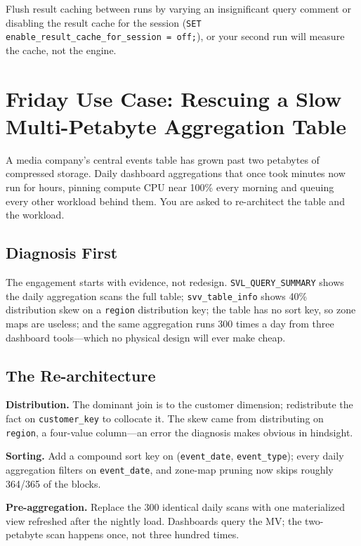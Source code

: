 \begin{tipbox}
Flush result caching between runs by varying an insignificant query comment or disabling the result cache for the session (\texttt{SET enable\_result\_cache\_for\_session = off;}), or your second run will measure the cache, not the engine.
\end{tipbox}

\section{Friday Use Case: Rescuing a Slow Multi-Petabyte Aggregation Table}
A media company's central events table has grown past two petabytes of compressed storage. Daily dashboard aggregations that once took minutes now run for hours, pinning compute CPU near 100\% every morning and queuing every other workload behind them. You are asked to re-architect the table and the workload.

\subsection{Diagnosis First}
The engagement starts with evidence, not redesign. \texttt{SVL\_QUERY\_SUMMARY} shows the daily aggregation scans the full table; \texttt{svv\_table\_info} shows 40\% distribution skew on a \texttt{region} distribution key; the table has no sort key, so zone maps are useless; and the same aggregation runs 300 times a day from three dashboard tools---which no physical design will ever make cheap.

\subsection{The Re-architecture}
\textbf{Distribution.} The dominant join is to the customer dimension; redistribute the fact on \texttt{customer\_key} to collocate it. The skew came from distributing on \texttt{region}, a four-value column---an error the diagnosis makes obvious in hindsight.

\textbf{Sorting.} Add a compound sort key on (\texttt{event\_date}, \texttt{event\_type}); every daily aggregation filters on \texttt{event\_date}, and zone-map pruning now skips roughly 364/365 of the blocks.

\textbf{Pre-aggregation.} Replace the 300 identical daily scans with one materialized view refreshed after the nightly load. Dashboards query the MV; the two-petabyte scan happens once, not three hundred times.

